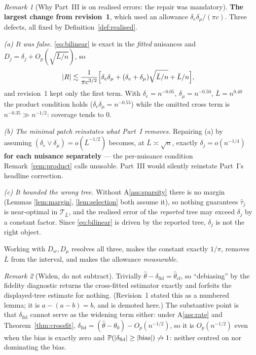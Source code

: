 \documentclass[11pt]{article}
\theoremstyle{plain}
\theoremstyle{definition}
\theoremstyle{remark}
\newtheorem{remark}{Remark}
\newcommand{\PP}{\mathbb{P}}
\newcommand{\cT}{\mathcal{T}}
\newcommand{\that}{\widehat{\tau}}
\newcommand{\thetahat}{\widehat{\theta}}
\newcommand{\Dw}{D_w}
\newcommand{\Dm}{D_\mu}
\DeclarePairedDelimiter{\abs}{\lvert}{\rvert}
\begin{document}
\begin{remark}[Why Part~III is on realised errors: the repair was mandatory]
\label{rem:whyD}
\textbf{The largest change from revision~1}, which used an allowance
$\delta_e\delta_\mu/(\pi c)$. Three defects, all fixed by
Definition~\ref{def:realised}.

\emph{(a) It was false.} \eqref{eq:bilinear} is exact in the \emph{fitted}
nuisances and $D_j=\delta_j+O_p(\sqrt{\bar L/n})$, so
\[
 \abs R\lesssim\frac1{\pi c^{3/2}}
  \Bigl[\delta_e\delta_\mu+(\delta_e+\delta_\mu)\sqrt{\bar L/n}+\bar L/n\Bigr],
\]
and revision~1 kept only the first term. With $\delta_e=n^{-0.05}$,
$\delta_\mu=n^{-0.50}$, $\bar L=n^{0.40}$ the product condition holds
($\delta_e\delta_\mu=n^{-0.55}$) while the omitted cross term is
$n^{-0.35}\gg n^{-1/2}$: coverage tends to $0$.

\emph{(b) The minimal patch reinstates what Part~I removes.} Repairing (a) by
assuming $(\delta_e\vee\delta_\mu)=o(\bar L^{-1/2})$ becomes, at
$\bar L\asymp\sqrt n$, exactly $\delta_j=o(n^{-1/4})$ \textbf{for each nuisance
separately} --- the per-nuisance condition Remark~\ref{rem:product} calls
unusable. Part~III would silently reinstate Part~I's headline correction.

\emph{(c) It bounded the wrong tree.} Without A\ref{ass:sparsity} there is no
margin (Lemmas \ref{lem:margin}, \ref{lem:selection} both assume it), so nothing
guarantees $\that_j$ is near-optimal in $\cT_{\bar L}$, and the realised error of
the \emph{reported} tree may exceed $\delta_j$ by a constant factor. Since
\eqref{eq:bilinear} is driven by the reported tree, $\delta_j$ is not the right
object.

Working with $\Dw,\Dm$ resolves all three, makes the constant exactly $1/\pi$,
removes $\bar L$ from the interval, and makes the allowance \emph{measurable}.
\end{remark}

\begin{remark}[Widen, do not subtract]\label{rem:no-subtract}
Trivially $\thetahat-\delta_{\mathrm{fid}}=\thetahat_{\mathrm{cf}}$, so
``debiasing'' by the fidelity diagnostic returns the cross-fitted estimator
exactly and forfeits the displayed-tree estimate for nothing. (Revision~1 stated
this as a numbered lemma; it is $a-(a-b)=b$, and is demoted here.) The substantive
point is that $\delta_{\mathrm{fid}}$ cannot serve as the widening term either:
under A\ref{ass:rate} and Theorem~\ref{thm:crossfit},
$\delta_{\mathrm{fid}}=(\thetahat-\theta_0)-O_p(n^{-1/2})$, so it is
$O_p(n^{-1/2})$ even when the bias is exactly zero and
$\PP(\abs{\delta_{\mathrm{fid}}}\ge\abs{\text{bias}})\not\to1$: neither centred on
nor dominating the bias.
\end{remark}
\end{document}
